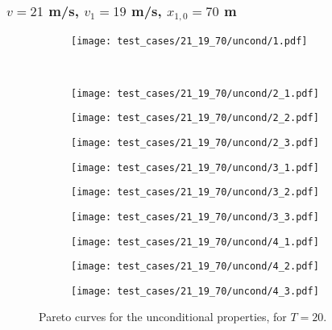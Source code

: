 \subsubsection{$v = 21$ m/s, $v_1 = 19$ m/s, $x_{1,0} = 70$ m}

\begin{figure}[H]
\centering
\begin{subfigure}{0.32\textwidth}
  \centering
  \texttt{[image: test\_cases/21\_19\_70/uncond/1.pdf]}
\end{subfigure}\\
\begin{subfigure}{0.32\textwidth}
  \centering
  \texttt{[image: test\_cases/21\_19\_70/uncond/2\_1.pdf]}
\end{subfigure} 
\begin{subfigure}{0.32\textwidth}
  \centering
  \texttt{[image: test\_cases/21\_19\_70/uncond/2\_2.pdf]}
\end{subfigure}
\begin{subfigure}{0.32\textwidth}
  \centering
  \texttt{[image: test\_cases/21\_19\_70/uncond/2\_3.pdf]}
\end{subfigure}
\begin{subfigure}{0.32\textwidth}
  \centering
  \texttt{[image: test\_cases/21\_19\_70/uncond/3\_1.pdf]}
\end{subfigure}
\begin{subfigure}{0.32\textwidth}
  \centering
  \texttt{[image: test\_cases/21\_19\_70/uncond/3\_2.pdf]}
\end{subfigure}
\begin{subfigure}{0.32\textwidth}
  \centering
  \texttt{[image: test\_cases/21\_19\_70/uncond/3\_3.pdf]}
\end{subfigure}
\begin{subfigure}{0.32\textwidth}
  \centering
  \texttt{[image: test\_cases/21\_19\_70/uncond/4\_1.pdf]}
\end{subfigure} 
\begin{subfigure}{0.32\textwidth}
  \centering
  \texttt{[image: test\_cases/21\_19\_70/uncond/4\_2.pdf]}
\end{subfigure}
\begin{subfigure}{0.32\textwidth}
  \centering
  \texttt{[image: test\_cases/21\_19\_70/uncond/4\_3.pdf]}
\end{subfigure}
\caption{Pareto curves for the unconditional properties, for $T = 20$.}
\label{fig:test_case_1_uncond}
\end{figure}

